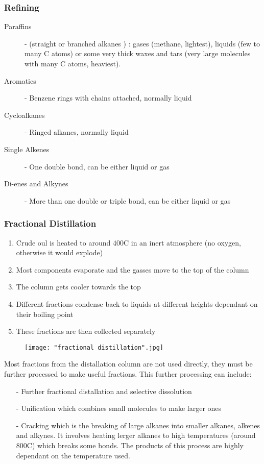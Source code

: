 \documentclass[a4paper, 12pt]{article}
\begin{document}
		\subsubsection{Refining}
			\begin{description}
				\item[Paraffins] - (straight or branched alkanes ) : gases (methane, lightest), liquids (few to many C atoms) or some very thick waxes and tars (very large molecules with many C atoms, heaviest).
				\item[Aromatics] - Benzene rings with chains attached, normally liquid
				\item[Cycloalkanes] - Ringed alkanes, normally liquid
				\item[Single Alkenes] - One double bond, can be either liquid or gas
				\item[Di-enes and Alkynes] - More than one double or triple bond, can be either liquid or gas
			\end{description}
		

						
			\subsubsection{Fractional Distillation}
			
				\begin{enumerate}
					\item Crude oul is heated to around 400\degree C in an inert atmosphere (no oxygen, otherwise it would explode)
					\item Most components evaporate and the gasses move to the top of the column
					\item The column gets cooler towards the top
					\item Different fractions condense back to liquids at different heights dependant on their boiling point
					\item These fractions are then collected separately
				\end{enumerate}
				
			
				\begin{figure}[!ht]
					\texttt{[image: "fractional distillation".jpg]}
				\end{figure}
				
				\newpage
				\clearpage		
			
				Most fractions from the distallation column are not used directly, they must be further processed to make useful fractions. This further processing can include:
				\begin{itemize}
					\item[-] Further fractional distallation and selective dissolution
					\item[-] Unification which combines small molecules to make larger ones
					\item[-] Cracking which is the breaking of large alkanes into smaller alkanes, alkenes and alkynes. It involves heating lerger alkanes to high temperatures (around 800\degree C) which breaks some  bonds. The products of this process are highly dependant on the temperature used.
				\end{itemize}
				
\end{document}

